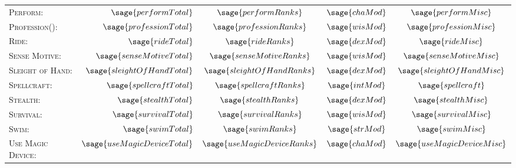 \documentclass[10pt]{article}
\begin{document}
\begin{tabular}{l r c c c}
		\textsc{Perform:} & \(\sage{performTotal}\) & \(\sage{performRanks}\) & \(\sage{chaMod}\) & \(\sage{performMisc}\) \\
		\textsc{Profession():} & \(\sage{professionTotal}\) & \(\sage{professionRanks}\) & \(\sage{wisMod}\) & \(\sage{professionMisc}\) \\
		\textsc{Ride:} & \(\sage{rideTotal}\) & \(\sage{rideRanks}\) & \(\sage{dexMod}\) & \(\sage{rideMisc}\) \\
		\textsc{Sense Motive:} & \(\sage{senseMotiveTotal}\) & \(\sage{senseMotiveRanks}\) & \(\sage{wisMod}\) & \(\sage{senseMotiveMisc}\) \\
		\textsc{Sleight of Hand:} & \(\sage{sleightOfHandTotal}\) & \(\sage{sleightOfHandRanks}\) & \(\sage{dexMod}\) & \(\sage{sleightOfHandMisc}\) \\
		\textsc{Spellcraft:} & \(\sage{spellcraftTotal}\) & \(\sage{spellcraftRanks}\) & \(\sage{intMod}\) & \(\sage{spellcraft}\) \\
		\textsc{Stealth:} & \(\sage{stealthTotal}\) & \(\sage{stealthRanks}\) & \(\sage{dexMod}\) & \(\sage{stealthMisc}\) \\
		\textsc{Survival:} & \(\sage{survivalTotal}\) & \(\sage{survivalRanks}\) & \(\sage{wisMod}\) & \(\sage{survivalMisc}\) \\
		\textsc{Swim:} & \(\sage{swimTotal}\) & \(\sage{swimRanks}\) & \(\sage{strMod}\) & \(\sage{swimMisc}\) \\
		\textsc{Use Magic Device:} & \(\sage{useMagicDeviceTotal}\) & \(\sage{useMagicDeviceRanks}\) & \(\sage{chaMod}\) & \(\sage{useMagicDeviceMisc}\) \\
	\end{tabular}
\end{document}
